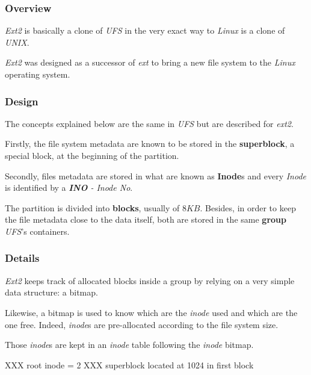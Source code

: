 
\begin{frame}
  \frametitle{Overview}

  \textit{Ext2} is basically a clone of \textit{UFS} in the very exact way
  to \textit{Linux} is a clone of \textit{UNIX}.

  \-

  \textit{Ext2} was designed as a successor of \textit{ext} to bring a new
  file system to the \textit{Linux} operating system.
\end{frame}


\begin{frame}
  \frametitle{Design}

  The concepts explained below are the same in \textit{UFS} but are described
  for \textit{ext2}.

  \-

  Firstly, the file system metadata are known to be stored in the
  \textbf{superblock}, a special block, at the beginning of the partition.

  \-

  Secondly, files metadata are stored in what are known as \textbf{Inode}s
  and every \textit{Inode} is identified by a \textit{\textbf{INO} - Inode No}.

  \-

  The partition is divided into \textbf{blocks}, usually of $8 KB$.
  Besides, in order to keep the file metadata close to the data itself,
  both are stored in the same \textbf{group} \ie{} \textit{UFS}'s
  containers.
\end{frame}


\begin{frame}
  \frametitle{Details}

  \textit{Ext2} keeps track of allocated blocks inside a group by relying
  on a very simple data structure: a bitmap.

  \-

  Likewise, a bitmap is used to know which are the \textit{inode} used and
  which are the one free. Indeed, \textit{inode}s are pre-allocated according
  to the file system size.

  \-

  Those \textit{inode}s are kept in an \textit{inode} table following the
  \textit{inode} bitmap.
\end{frame}

XXX root inode = 2
XXX superblock located at 1024 in first block

